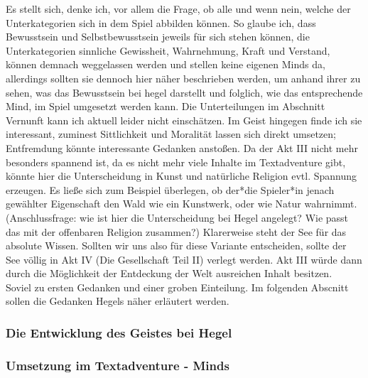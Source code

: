 \documentclass[a4paper, 12pt]{scrartcl}
\begin{document}
    Es stellt sich, denke ich, vor allem die Frage, ob alle und wenn nein, welche der Unterkategorien sich in dem Spiel abbilden können. 
    So glaube ich, dass Bewusstsein und Selbstbewusstsein jeweils für sich stehen können, die Unterkategorien sinnliche Gewissheit, Wahrnehmung, Kraft und Verstand, können demnach weggelassen werden und stellen keine eigenen Minds da, allerdings sollten sie dennoch hier näher beschrieben werden, um anhand ihrer zu sehen, was das Bewusstsein bei hegel darstellt und folglich, wie das entsprechende Mind, im Spiel umgesetzt werden kann.
    Die Unterteilungen im Abschnitt \glqq Vernunft\grqq{} kann ich aktuell leider nicht einschätzen. Im Geist hingegen finde ich sie interessant, zuminest Sittlichkeit und Moralität lassen sich direkt umsetzen; Entfremdung könnte interessante Gedanken anstoßen.
    Da der Akt III nicht mehr besonders spannend ist, da es nicht mehr viele Inhalte im Textadventure gibt, könnte hier die Unterscheidung in Kunst und natürliche Religion evtl. Spannung erzeugen. 
    Es ließe sich zum Beispiel überlegen, ob der*die Spieler*in jenach gewählter Eigenschaft den Wald wie ein Kunstwerk, oder wie Natur wahrnimmt. 
    (Anschlussfrage: wie ist hier die Unterscheidung bei Hegel angelegt? Wie passt das mit der offenbaren Religion zusammen?)
    Klarerweise steht der See für das absolute Wissen. 
    Sollten wir uns also für diese Variante entscheiden, sollte der See völlig in Akt IV (Die Gesellschaft Teil II) verlegt werden.
    Akt III würde dann durch die Möglichkeit der Entdeckung der Welt ausreichen Inhalt besitzen.\\

    Soviel zu ersten Gedanken und einer groben Einteilung. 
    Im folgenden Abscnitt sollen die Gedanken Hegels näher erläutert werden.

    \subsubsection{Die Entwicklung des Geistes bei Hegel}
    
    \subsubsection{Umsetzung im Textadventure - Minds}
\end{document}

